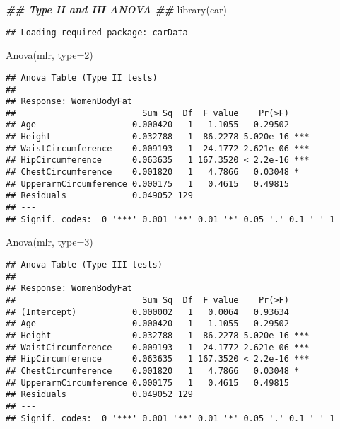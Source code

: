 \documentclass[
]{article}
\newenvironment{Shaded}{\begin{snugshade}}{\end{snugshade}}
\newcommand{\AttributeTok}[1]{\textcolor[rgb]{0.77,0.63,0.00}{#1}}
\newcommand{\DecValTok}[1]{\textcolor[rgb]{0.00,0.00,0.81}{#1}}
\newcommand{\DocumentationTok}[1]{\textcolor[rgb]{0.56,0.35,0.01}{\textbf{\textit{#1}}}}
\newcommand{\FunctionTok}[1]{\textcolor[rgb]{0.00,0.00,0.00}{#1}}
\newcommand{\NormalTok}[1]{#1}
\begin{document}
\begin{Shaded}
\begin{Highlighting}[]
\DocumentationTok{\#\# Type II and III ANOVA \#\#}
\FunctionTok{library}\NormalTok{(car)}
\end{Highlighting}
\end{Shaded}

\begin{verbatim}
## Loading required package: carData
\end{verbatim}

\begin{Shaded}
\begin{Highlighting}[]
\FunctionTok{Anova}\NormalTok{(mlr, }\AttributeTok{type=}\DecValTok{2}\NormalTok{)}
\end{Highlighting}
\end{Shaded}

\begin{verbatim}
## Anova Table (Type II tests)
## 
## Response: WomenBodyFat
##                         Sum Sq  Df  F value    Pr(>F)    
## Age                   0.000420   1   1.1055   0.29502    
## Height                0.032788   1  86.2278 5.020e-16 ***
## WaistCircumference    0.009193   1  24.1772 2.621e-06 ***
## HipCircumference      0.063635   1 167.3520 < 2.2e-16 ***
## ChestCircumference    0.001820   1   4.7866   0.03048 *  
## UpperarmCircumference 0.000175   1   0.4615   0.49815    
## Residuals             0.049052 129                       
## ---
## Signif. codes:  0 '***' 0.001 '**' 0.01 '*' 0.05 '.' 0.1 ' ' 1
\end{verbatim}

\begin{Shaded}
\begin{Highlighting}[]
\FunctionTok{Anova}\NormalTok{(mlr, }\AttributeTok{type=}\DecValTok{3}\NormalTok{)}
\end{Highlighting}
\end{Shaded}

\begin{verbatim}
## Anova Table (Type III tests)
## 
## Response: WomenBodyFat
##                         Sum Sq  Df  F value    Pr(>F)    
## (Intercept)           0.000002   1   0.0064   0.93634    
## Age                   0.000420   1   1.1055   0.29502    
## Height                0.032788   1  86.2278 5.020e-16 ***
## WaistCircumference    0.009193   1  24.1772 2.621e-06 ***
## HipCircumference      0.063635   1 167.3520 < 2.2e-16 ***
## ChestCircumference    0.001820   1   4.7866   0.03048 *  
## UpperarmCircumference 0.000175   1   0.4615   0.49815    
## Residuals             0.049052 129                       
## ---
## Signif. codes:  0 '***' 0.001 '**' 0.01 '*' 0.05 '.' 0.1 ' ' 1
\end{verbatim}
\end{document}
